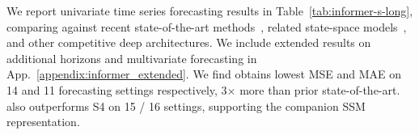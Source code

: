 We report univariate time series forecasting results in Table~\ref{tab:informer-s-long}, 
comparing against recent state-of-the-art methods~\citep{zeng2022transformers, zhou2022film}, related state-space models~\citep{gu2021efficiently}, and other competitive deep architectures.
We include extended results on additional horizons and multivariate forecasting in App.~\ref{appendix:informer_extended}.
%
%
We find \ourmethod{} obtains lowest MSE and MAE on 14 and 11 forecasting settings respectively, 3$\times$ more than prior state-of-the-art. \ourmethod{} also outperforms S4 on 15 / 16 settings, supporting the companion SSM representation.


